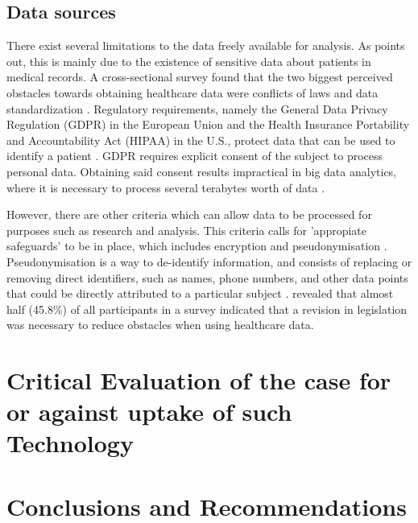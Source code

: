 \documentclass[a4paper,12pt]{article}
\begin{document}
\subsection{Data sources}

There exist several limitations to the data freely available for analysis.
As \textcite[2]{Dalianis2015} points out, this is mainly due to the existence of sensitive data about patients in medical records.
A cross-sectional survey found that the two biggest perceived obstacles towards obtaining healthcare data were conflicts of laws and data standardization \parencite{Kim2019}.
Regulatory requirements, namely the General Data Privacy Regulation (GDPR) in the European Union and the Health Insurance Portability and Accountability Act (HIPAA) in the U.S., protect data that can be used to identify a patient \parencite{Iyengar2018}.
GDPR requires explicit consent of the subject to process personal data. Obtaining said consent results impractical in big data analytics, where it is necessary to process several terabytes worth of data \parencite{Hintze2018}.

However, there are other criteria which can allow data to be processed for purposes such as research and analysis.
This criteria calls for 'appropiate safeguards' to be in place, which includes encryption and pseudonymisation \parencite[151]{Hintze2018}.
Pseudonymisation is a way to de-identify information, and consists of replacing or removing direct identifiers, such as names, phone numbers, and other data points that could be directly attributed to a particular subject \parencite[146-147]{Hintze2018}.
\textcite{Kim2019} revealed that almost half (45.8\%) of all participants in a survey indicated that a revision in legislation was necessary to reduce obstacles when using healthcare data.



\section{Critical Evaluation of the case for or against uptake of such Technology}
\section{Conclusions and Recommendations}

\printbibliography
\end{document}
